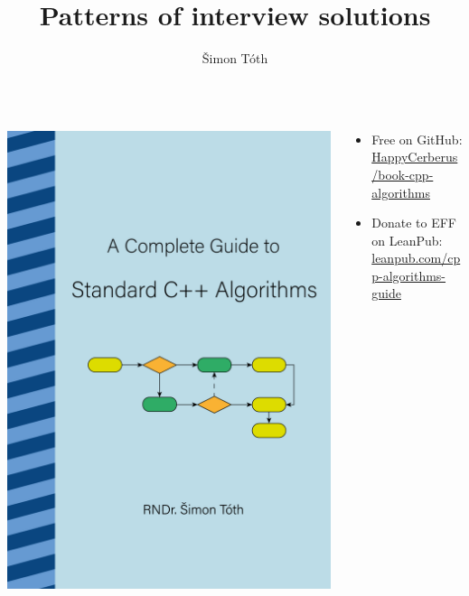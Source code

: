 \documentclass[aspectratio=169]{beamer}
\title{Patterns of interview solutions}
\author{Šimon Tóth}
\begin{document}
\frame{\titlepage}


\begin{frame}{}
  \begin{columns}
      \begin{column}{0.35\textwidth}
          \includegraphics[height=0.8\textheight]{static/book_cover_algo.png}
      \end{column}
      \begin{column}{0.6\textwidth}
          \begin{itemize}
              \item Free on GitHub:\\
                  \href{https://github.com/HappyCerberus/book-cpp-algorithms}{HappyCerberus/book-cpp-algorithms}
              \item Donate to EFF on LeanPub:\\
                  \href{https://leanpub.com/cpp-algorithms-guide}{leanpub.com/cpp-algorithms-guide}
          \end{itemize}
      \end{column}
  \end{columns}
\end{frame}
\end{document}
